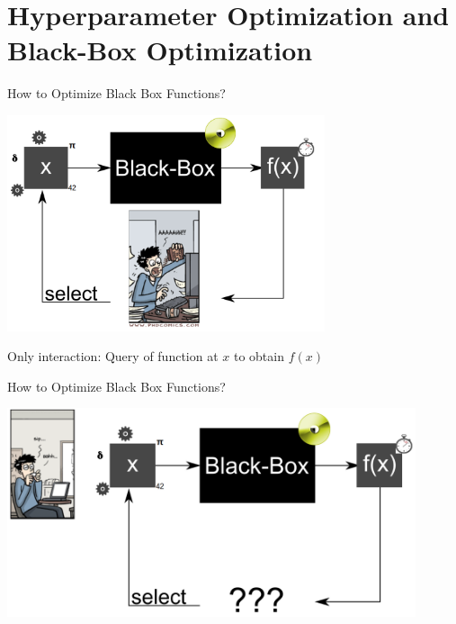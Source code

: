 \section{Hyperparameter Optimization and Black-Box Optimization}
\begin{frame}[c]{How to Optimize Black Box Functions?}

\centering
\includegraphics[width=0.7\textwidth]{images/black_box_manual_opt.png}

Only interaction: Query of function at $x$ to obtain $f(x)$

\end{frame}
\begin{frame}[c]{How to Optimize Black Box Functions?}

\centering
\includegraphics[width=0.9\textwidth]{images/black_box_aut_opt.png}

\end{frame}
